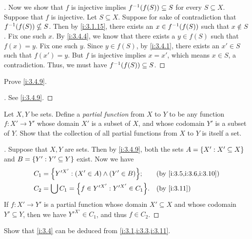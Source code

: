 \begin{proof}[]
  Now we show that \(f\) is injective implies \(f^{-1}\pa{f(S)} \subseteq S\) for every \(S \subseteq X\).
  Suppose that \(f\) is injective.
  Let \(S \subseteq X\).
  Suppose for sake of contradiction that \(f^{-1}\pa{f(S)} \nsubseteq S\).
  Then by \cref{i:3.1.15}, there exists an \(x \in f^{-1}\pa{f(S)}\) such that \(x \notin S\).
  Fix one such \(x\).
  By \cref{i:3.4.4}, we know that there exists a \(y \in f(S)\) such that \(f(x) = y\).
  Fix one such \(y\).
  Since \(y \in f(S)\), by \cref{i:3.4.1}, there exists an \(x' \in S\) such that \(f(x') = y\).
  But \(f\) is injective implies \(x = x'\), which means \(x \in S\), a contradiction.
  Thus, we must have \(f^{-1}\pa{f(S)} \subseteq S\).
\end{proof}

\begin{ex}\label{i:ex:3.4.6}
  Prove \cref{i:3.4.9}.
\end{ex}

\begin{proof}[]
  See \cref{i:3.4.9}.
\end{proof}

\begin{ex}\label{i:ex:3.4.7}
  Let \(X, Y\) be sets.
  Define a \emph{partial function} from \(X\) to \(Y\) to be any function \(f : X' \to Y'\) whose domain \(X'\) is a subset of \(X\), and whose codomain \(Y'\) is a subset of \(Y\).
  Show that the collection of all partial functions from \(X\) to \(Y\) is itself a set.
\end{ex}

\begin{proof}[]
  Suppose that \(X, Y\) are sets.
  Then by \cref{i:3.4.9}, both the sets \(A = \left\lbrace X' : X' \subseteq X\right\rbrace\) and \(B = \left\lbrace Y' : Y' \subseteq Y\right\rbrace\) exist.
  Now we have
  \begin{align*}
    C_1 & = \set{Y'^{X'} : \pa{X' \in A} \land \pa{Y' \in B}};   &  & \by{i:3.5,i:3.6,i:3.10} \\
    C_2 & = \bigcup C_1 = \set{f \in Y'^{X'} : Y'^{X'} \in C_1}. &  & \by{i:3.11}             \\
  \end{align*}
  If \(f : X' \to Y'\) is a partial function whose domain \(X' \subseteq X\) and whose codomain \(Y' \subseteq Y\), then we have \(Y'^{X'} \in C_1\), and thus \(f \in C_2\).
\end{proof}

\begin{ex}\label{i:ex:3.4.8}
  Show that \cref{i:3.4} can be deduced from \cref{i:3.1,i:3.3,i:3.11}.
\end{ex}

